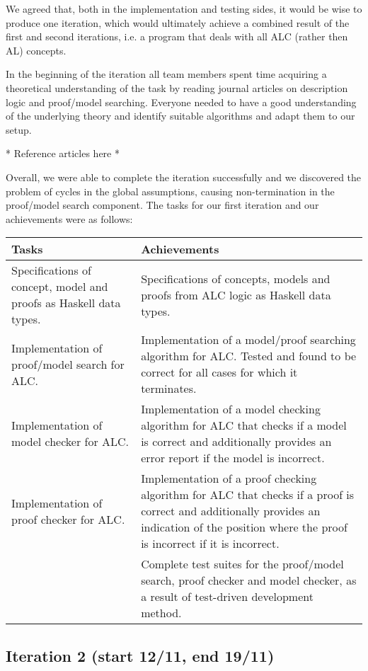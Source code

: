 We agreed that, both in the implementation and testing sides, it would be wise to produce one iteration, which would ultimately achieve a combined result of the first and second iterations, i.e. a program that deals with all ALC (rather then AL) concepts.

In the beginning of the iteration all team members spent time acquiring a theoretical understanding of the task by reading journal articles on description logic and proof/model searching. Everyone needed to have a good understanding of the underlying theory and identify suitable algorithms and adapt them to our setup.

* Reference articles here *

Overall, we were able to complete the iteration successfully and we discovered the problem of cycles in the global assumptions, causing non-termination in the proof/model search component. The tasks for our first iteration and our achievements were as follows:

\begin{center}
\begin{longtable}{| p{7cm} | p{8cm} |}
\hline
\textbf{Tasks} & \textbf{Achievements} \\
\hline
Specifications of concept, model and proofs as Haskell data types.
& Specifications of concepts, models and proofs from ALC logic as Haskell data types.\\
\hline
Implementation of proof/model search for ALC.
& Implementation of a model/proof searching algorithm for ALC. Tested and found to be correct for all cases for which it terminates. \\
\hline
Implementation of model checker for ALC.
& Implementation of a model checking algorithm for ALC that checks if a model is correct and additionally provides an error report if the model is incorrect.\\
\hline
Implementation of proof checker for ALC.
& Implementation of a proof checking algorithm for ALC that checks if a proof is correct and additionally provides an indication of the position where the proof is incorrect if it is incorrect.\\
\hline
& Complete test suites for the proof/model search, proof checker and model checker, as a result of test-driven development method.\\
\hline
\end{longtable}
\end{center}

\subsection*{Iteration 2 (start 12/11, end 19/11)}

